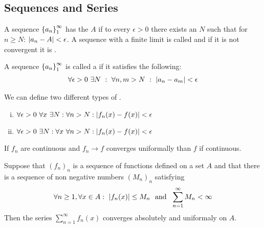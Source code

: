 \subsection{Sequences and Series}

\begin{definition}
    A sequence $\left\{ a_n \right\}_1^\infty$ has the  $A$ if to
    every $\epsilon > 0$ there exists an $N$ such that for $n \geq N$: $\left\vert a_n - A \right\vert
    < \epsilon$. A sequence with a finite limit is called
     and if it is not convergent it is .
\end{definition}

\begin{definition}
    A sequence $\left\{ a_n \right\}_1^\infty$ is called a 
    if it satisfies the following:
    \begin{align*}
        \forall \epsilon > 0 \ \exists N \ : \ \forall n,m > N \ : \ \left\vert a_n - a_m \right\vert < \epsilon
    \end{align*}
\end{definition}

\begin{definition}[Convergence]
    We can define two different types of .
    \begin{enumerate}[(i)]
        \item {} $\forall \epsilon > 0 \ \forall x \ \exists N : \forall n > N : \abs{f_n(x) - f(x)} < \epsilon$
        \item {} $\forall \epsilon > 0 \ \exists N : \forall x \ \forall n > N : \left\vert f_n(x) - f(x) \right\vert < \epsilon$
    \end{enumerate}
\end{definition}

\begin{proposition}
    If $f_n$ are continuous and $f_n \rightarrow f$ converges uniformally than $f$
    if continuous.
\end{proposition}

\begin{theorem}
    Suppose that $(f_n)_n$ is a sequence of functions defined on a set $A$ and that
    there is a sequence of non negative numbers $(M_n)_n$ satisfying
    \begin{align*}
        \forall n \geq 1 , \forall x \in A : \ \left\vert f_n(x) \right\vert \leq M_n
        \ \text{ and } \ \sum_{n=1}^\infty M_n < \infty
    \end{align*}
    Then the series $\sum_{n=1}^\infty f_n(x)$ converges absolutely and uniformaly
    on $A$.
\end{theorem}

